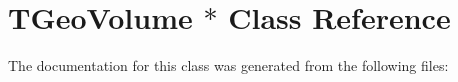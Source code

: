\hypertarget{class_t_geo_volume_01_5}{
\section{TGeoVolume $\ast$ Class Reference}
\label{class_t_geo_volume_01_5}
}


The documentation for this class was generated from the following files: